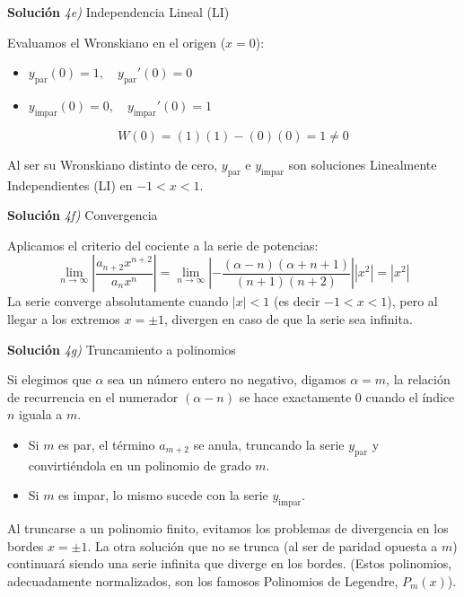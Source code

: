 \documentclass[11pt,spanish]{article}
\newcounter{problema}
\begin{document}
\vspace{0.5cm}
{\bf Soluci\'on }{\em 4e)}
Independencia Lineal (LI)
\vspace{0.5cm}

Evaluamos el Wronskiano en el origen ($x=0$):
\begin{itemize}
\item $y_{\text{par}}(0) = 1, \quad y_{\text{par}}'(0) = 0$
\item $y_{\text{impar}}(0) = 0, \quad y_{\text{impar}}'(0) = 1$
\end{itemize}
$$W(0) = (1)(1) - (0)(0) = 1 \neq 0$$

Al ser su Wronskiano distinto de cero, $y_{\text{par}}$ e $y_{\text{impar}}$ son soluciones Linealmente Independientes (LI) en $-1<x<1$.

\vspace{0.5cm}
{\bf Soluci\'on }{\em 4f)}
Convergencia
\vspace{0.5cm}

Aplicamos el criterio del cociente a la serie de potencias:
$$\lim_{n\to\infty} \left| \frac{a_{n+2}x^{n+2}}{a_n x^n} \right| = \lim_{n\to\infty} \left| -\frac{(\alpha-n)(\alpha+n+1)}{(n+1)(n+2)} \right| |x^2| = |x^2|$$
La serie converge absolutamente cuando $|x| < 1$ (es decir $-1<x<1$), pero al llegar a los extremos $x = \pm 1$, divergen en caso de que la serie sea infinita.

\vspace{0.5cm}
{\bf Soluci\'on }{\em 4g)}
Truncamiento a polinomios
\vspace{0.5cm}

Si elegimos que $\alpha$ sea un número entero no negativo, digamos $\alpha = m$, la relación de recurrencia en el numerador $(\alpha-n)$ se hace exactamente $0$ cuando el índice $n$ iguala a $m$.
\begin{itemize}
\item Si $m$ es par, el término $a_{m+2}$ se anula, truncando la serie $y_{\text{par}}$ y convirtiéndola en un polinomio de grado $m$.
\item Si $m$ es impar, lo mismo sucede con la serie $y_{\text{impar}}$.
\end{itemize}
Al truncarse a un polinomio finito, evitamos los problemas de divergencia en los bordes $x=\pm 1$. La otra solución que no se trunca (al ser de paridad opuesta a $m$) continuará siendo una serie infinita que diverge en los bordes. (Estos polinomios, adecuadamente normalizados, son los famosos Polinomios de Legendre, $P_m(x)$).
\end{document}
